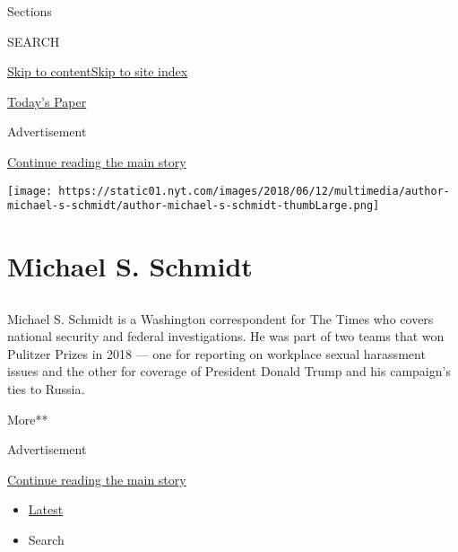 Sections

SEARCH

\protect\hyperlink{site-content}{Skip to
content}\protect\hyperlink{site-index}{Skip to site index}

\href{https://myaccount.nytimes.com/auth/login?response_type=cookie\&client_id=vi}{}

\href{https://www.nytimes.com/section/todayspaper}{Today's Paper}

Advertisement

\protect\hyperlink{after-top}{Continue reading the main story}

\texttt{[image: https://static01.nyt.com/images/2018/06/12/multimedia/author-michael-s-schmidt/author-michael-s-schmidt-thumbLarge.png]}

\hypertarget{michael-s-schmidt}{%
\section{Michael S. Schmidt}\label{michael-s-schmidt}}

\hypertarget{section}{%
\subsection{}\label{section}}

Michael S. Schmidt is a Washington correspondent for The Times who
covers national security and federal investigations. He was part of two
teams that won Pulitzer Prizes in 2018 --- one for reporting on
workplace sexual harassment issues and the other for coverage of
President Donald Trump and his campaign's ties to Russia.

More**

Advertisement

\protect\hyperlink{after-mid1}{Continue reading the main story}

\begin{itemize}
\tightlist
\item
  \protect\hyperlink{stream-panel}{Latest}
\item
  Search
\end{itemize}

